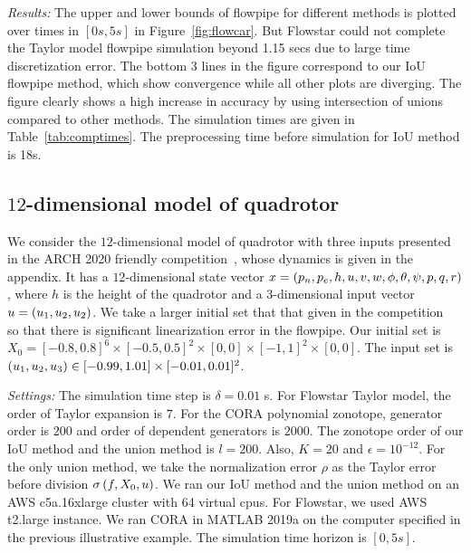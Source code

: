 \emph{Results:}  The upper and lower bounds of flowpipe for different
  methods is plotted over times in $[0 s,5 s]$ in
  Figure~\ref{fig:flowcar}.  But Flowstar could not complete the Taylor
  model flowpipe simulation beyond 1.15 secs due to large
  time discretization error.  The bottom 3 lines in the figure correspond
  to our IoU flowpipe method, which show convergence while all other
  plots are diverging.  The figure clearly shows a high increase in
  accuracy by using intersection of unions compared to other methods.
  The simulation times are given in Table~\ref{tab:comptimes}.  The
  preprocessing time before simulation for IoU method is 18s.
\subsection{$12$-dimensional model of quadrotor}
We consider the $12$-dimensional model of quadrotor with three inputs
presented in the ARCH 2020 friendly
competition~\cite{geretti2020arch}, whose dynamics is given in the
appendix.  It has a $12$-dimensional state vector $x
= \left(p_n,p_e,h,u,v,w,\phi,\theta,\psi,p,q,r\right)$, where $h$ is the
height of the quadrotor and a $3$-dimensional input vector $u
= \left(u_1,u_2,u_2\right)$.  We take a larger initial set that that
given in the competition~\cite{geretti2020arch} so that there is significant
linearization error in the flowpipe.  Our initial set is $X_0 =
[-0.8,0.8]^6\times[-0.5,0.5]^2\times[0,0]\times [-1,1]^2\times[0,0]$.
The input set is $\left(u_1,u_2,u_3\right)\in
[-0.99,1.01]\times[-0.01,0.01]^2$.

\emph{Settings:}  The simulation time step is $\delta = 0.01$ s.  For
  Flowstar Taylor model, the order of Taylor expansion is $7$.  For
  the CORA polynomial zonotope, generator order is $200$ and order of
  dependent generators is $2000$.  The zonotope order of our IoU
  method and the union method is $l=200$.  Also, $K = 20$ and
  $\epsilon = 10^{-12}$.  For the only union method, we take the
  normalization error $\rho$ as the Taylor error before division
  $\sigma\left(f,X_0,u\right)$.  We ran our IoU method and the union method on
  an AWS c5a.16xlarge cluster with 64 virtual cpus.  For Flowstar, we
  used AWS t2.large instance.  We ran CORA in MATLAB 2019a on the
  computer specified in the previous illustrative example.  The
  simulation time horizon is $[0, 5 s]$.

